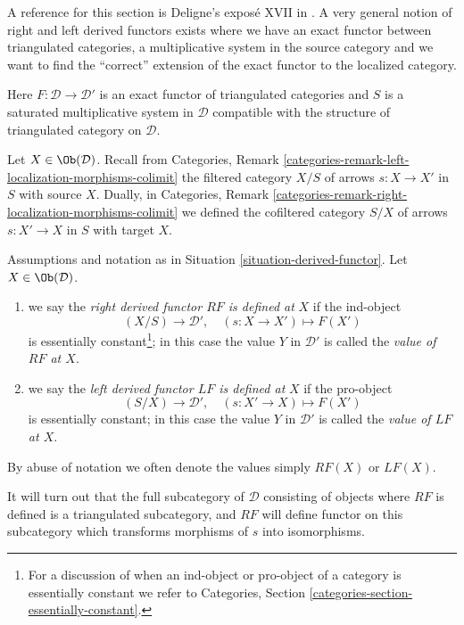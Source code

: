 \noindent
A reference for this section is Deligne's expos\'e XVII in \cite{SGA4}.
A very general notion of right and left derived functors exists where
we have an exact functor between triangulated categories, a multiplicative
system in the source category and we want to find the ``correct'' extension
of the exact functor to the localized category.

\begin{situation}
\label{situation-derived-functor}
Here $F : \mathcal{D} \to \mathcal{D}'$ is an exact functor of triangulated
categories and $S$ is a saturated multiplicative
system in $\mathcal{D}$ compatible with the structure
of triangulated category on $\mathcal{D}$.
\end{situation}

\noindent
Let $X \in \Ob(\mathcal{D})$. Recall from
Categories, Remark \ref{categories-remark-left-localization-morphisms-colimit}
the filtered category $X/S$ of arrows $s : X \to X'$ in $S$ with source $X$.
Dually, in
Categories, Remark \ref{categories-remark-right-localization-morphisms-colimit}
we defined the cofiltered category $S/X$ of arrows $s : X' \to X$ in $S$
with target $X$.

\begin{definition}
\label{definition-right-derived-functor-defined}
Assumptions and notation as in
Situation \ref{situation-derived-functor}.
Let $X \in \Ob(\mathcal{D})$.
\begin{enumerate}
\item we say the {\it right derived functor $RF$ is defined at}
$X$ if the ind-object
$$
(X/S) \longrightarrow \mathcal{D}', \quad
(s : X \to X') \longmapsto F(X')
$$
is essentially constant\footnote{For a discussion of when an ind-object
or pro-object of a category is essentially constant we refer to
Categories, Section \ref{categories-section-essentially-constant}.};
in this case the value
$Y$ in $\mathcal{D}'$ is called the {\it value of $RF$ at $X$}.
\item we say the {\it left derived functor $LF$ is defined at} $X$
if the pro-object
$$
(S/X) \longrightarrow \mathcal{D}', \quad
(s: X' \to X) \longmapsto F(X')
$$
is essentially constant; in this case the value $Y$ in $\mathcal{D}'$
is called the {\it value of $LF$ at $X$}.
\end{enumerate}
By abuse of notation we often denote the values simply
$RF(X)$ or $LF(X)$.
\end{definition}

\noindent
It will turn out that the full subcategory of $\mathcal{D}$ consisting
of objects where $RF$ is defined is a triangulated subcategory, and
$RF$ will define functor on this subcategory which transforms morphisms
of $s$ into isomorphisms.

